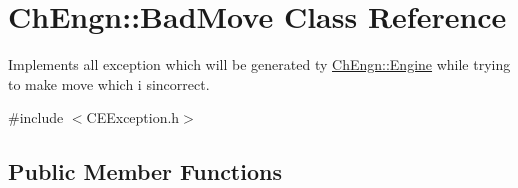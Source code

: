 \hypertarget{classChEngn_1_1BadMove}{
\section{ChEngn::BadMove Class Reference}
\label{classChEngn_1_1BadMove}
}


Implements all exception which will be generated ty \hyperlink{classChEngn_1_1Engine}{ChEngn::Engine} while trying to make move which i sincorrect.  




{\ttfamily \#include $<$CEException.h$>$}

\subsection*{Public Member Functions}
